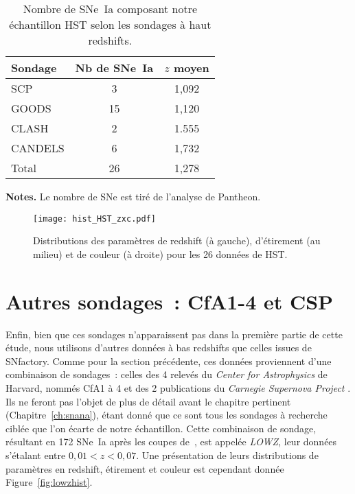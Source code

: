 \documentclass[../main/main.tex]{subfiles}
\begin{document}
\begin{table}[]
    \centering
    \begin{threeparttable}
        \caption[Nombre de SNe~Ia de notre échantillon HST selon la
        source]{Nombre de SNe~Ia composant notre échantillon HST selon les
        sondages à haut redshifts.}
        \label{tab:hstcuts}
        \begin{tabular}{lcc}
            \toprule
            Sondage & Nb de SNe~Ia & $z$ moyen \\
            \midrule
            SCP     & 3            & 1,092 \\
            GOODS   & 15           & 1,120 \\
            CLASH   & 2            & 1.555 \\
            CANDELS & 6            & 1,732 \\
            \midrule
            Total   & 26           & 1,278 \\
            \bottomrule
        \end{tabular}
        \begin{tablenotes}[flushleft]
        \item \textbf{\hspace{-3,2pt}Notes.} Le nombre de SNe est tiré de
            l'analyse de Pantheon.
        \end{tablenotes}
    \end{threeparttable}
\end{table}

\begin{figure}[]
    \centering
    \texttt{[image: hist\_HST\_zxc.pdf]}
    \caption[Distributions des paramètres de redshift, étirement et couleur de
    HST]{Distributions des paramètres de redshift (à gauche), d'étirement (au
    milieu) et de couleur (à droite) pour les 26 données de HST.}
    \label{fig:hsthist}
\end{figure}

\section{Autres sondages~: CfA1-4 et CSP}\label{sec:lowz}

Enfin, bien que ces sondages n'apparaissent pas dans la première partie de cette
étude, nous utilisons d'autres données à bas redshifts que celles issues de
SNfactory. Comme pour la section précédente, ces données proviennent d'une
combinaison de sondages~: celles des 4 relevés du \textit{Center for
Astrophysics} de Harvard, nommés CfA1 à 4 \citep{riess1999, jha2006,
hicken2009a, hicken2009b, hicken2012} et des 2 publications du \textit{Carnegie
Supernova Project} \citep[CSP,][]{contreras2010, folatelli2010,
stritzinger2011}. Ils ne feront pas l'objet de plus de détail avant le chapitre
pertinent (Chapitre~\ref{ch:snana}), étant donné que ce sont tous les sondages à
recherche ciblée que l'on écarte de notre échantillon. Cette combinaison de
sondage, résultant en 172 SNe~Ia après les coupes de~\cite{scolnic2018}, est
appelée \textit{LOWZ}, leur données s'étalant entre $0,01 < z < 0,07$. Une
présentation de leurs distributions de paramètres en redshift, étirement et
couleur est cependant donnée Figure~\ref{fig:lowzhist}.
\end{document}
